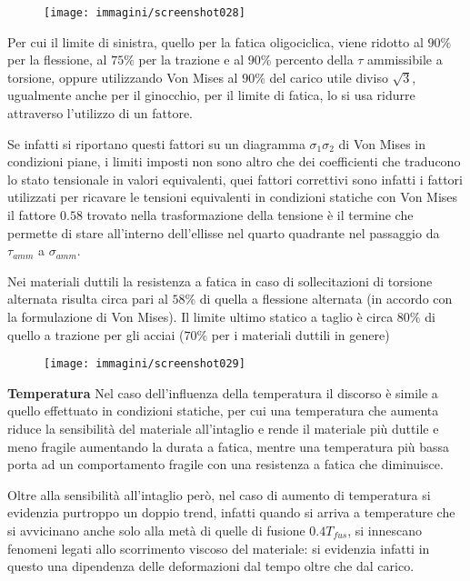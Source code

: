 \documentclass{article}
\begin{document}
\begin{adjustwidth}{2in}{}
\begin{figure}[H]
	\centering
	\texttt{[image: immagini/screenshot028]}
	\label{fig:screenshot028}
\end{figure}			 
			 
			 Per cui il limite di sinistra, quello per la fatica oligociclica, viene ridotto al $ 90\% $ per la flessione, al $ 75\% $ per la trazione e al $ 90\% $ percento della $\tau$  ammissibile a torsione, oppure utilizzando Von Mises al $ 90\% $ del carico utile diviso $\sqrt{3}$, ugualmente anche per il ginocchio, per il limite di fatica, lo si usa ridurre attraverso l'utilizzo di un fattore.
			 
			 Se infatti si riportano questi fattori su un diagramma $ \sigma_1\sigma_2 $ di Von Mises in condizioni piane, i limiti imposti non sono altro che dei coefficienti che traducono lo stato tensionale in valori equivalenti, quei fattori correttivi sono infatti i fattori utilizzati per ricavare le tensioni equivalenti in condizioni statiche con Von Mises il fattore $ 0.58 $ trovato nella trasformazione della tensione è il termine che permette di stare all'interno dell'ellisse nel quarto quadrante nel passaggio da $\tau_{amm}$ a $\sigma_{amm}$. \newline 
			 
			 Nei materiali duttili la resistenza a fatica in caso di sollecitazioni di torsione alternata risulta circa pari al $ 58\% $ di
			 quella a flessione alternata (in accordo con la formulazione di Von Mises).
			 Il
			 limite ultimo statico a taglio è circa $ 80\% $ di quello a trazione per gli acciai ($ 70\% $ per i materiali duttili in genere)
			 
			 			 \begin{figure}[H]
			 	\centering
			 	\texttt{[image: immagini/screenshot029]}
			 	\label{fig:screenshot029}
			 \end{figure}
			 			 
			 \textbf{\Large Temperatura}\newline
			 Nel caso dell'influenza della temperatura il discorso è simile a quello effettuato in condizioni statiche, per cui una temperatura che aumenta riduce la sensibilità del materiale all'intaglio e rende il materiale più duttile e meno fragile aumentando la durata a fatica, mentre una temperatura più bassa porta ad un comportamento fragile con una resistenza a fatica che diminuisce. 
			 
			 Oltre alla sensibilità all'intaglio però, nel caso di aumento di temperatura si evidenzia purtroppo un doppio trend, infatti quando si arriva a temperature che si avvicinano anche solo alla metà di quelle di fusione $0.4T_{fus}$, si innescano fenomeni legati allo scorrimento viscoso del materiale: si evidenzia infatti in questo una dipendenza delle deformazioni dal tempo oltre che dal carico. 
			 

\end{adjustwidth}
\end{document}
